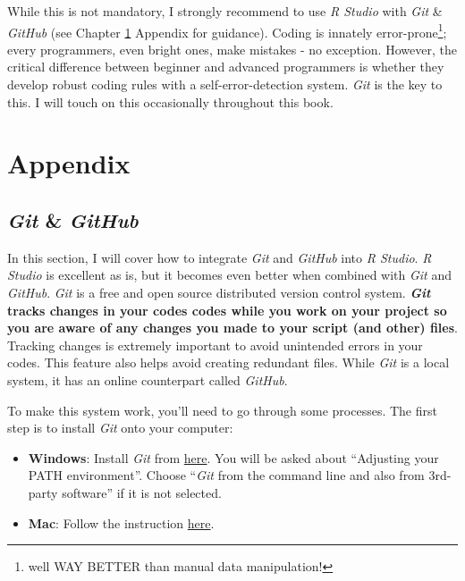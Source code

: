 \documentclass[
]{book}
\begin{document}
While this is not mandatory, I strongly recommend to use \emph{R Studio} with \emph{Git} \& \emph{GitHub} (see Chapter \ref{appendix} Appendix for guidance). Coding is innately error-prone\footnote{well WAY BETTER than manual data manipulation!}; every programmers, even bright ones, make mistakes - no exception. However, the critical difference between beginner and advanced programmers is whether they develop robust coding rules with a self-error-detection system. \emph{Git} is the key to this. I will touch on this occasionally throughout this book.

\hypertarget{appendix}{%
\chapter{Appendix}\label{appendix}}

\hypertarget{git-github}{%
\section{\texorpdfstring{\emph{Git} \& \emph{GitHub}}{Git \& GitHub}}\label{git-github}}

In this section, I will cover how to integrate \emph{Git} and \emph{GitHub} into \emph{R Studio}. \emph{R Studio} is excellent as is, but it becomes even better when combined with \emph{Git} and \emph{GitHub}. \emph{Git} is a free and open source distributed version control system. \textbf{\emph{Git}} \textbf{tracks changes in your codes codes while you work on your project so you are aware of any changes you made to your script (and other) files}. Tracking changes is extremely important to avoid unintended errors in your codes. This feature also helps avoid creating redundant files. While \emph{Git} is a local system, it has an online counterpart called \emph{GitHub}.

To make this system work, you'll need to go through some processes. The first step is to install \emph{Git} onto your computer:

\begin{itemize}
\item
  \textbf{Windows}: Install \emph{Git} from \href{https://gitforwindows.org/}{here}. You will be asked about ``Adjusting your PATH environment''. Choose ``\emph{Git} from the command line and also from 3rd-party software'' if it is not selected.
\item
  \textbf{Mac}: Follow the instruction \href{https://happygitwithr.com/install-git.html}{here}.
\end{itemize}
\end{document}
